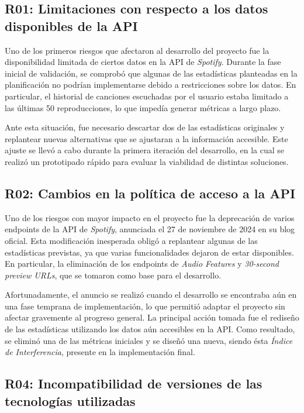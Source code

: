 \newpage

\subsection*{R01: Limitaciones con respecto a los datos disponibles de la API}

Uno de los primeros riesgos que afectaron al desarrollo del proyecto fue la disponibilidad limitada de ciertos datos en la API de \textit{Spotify}. Durante la fase inicial de validación, se comprobó que algunas de las estadísticas planteadas en la planificación no podrían implementarse debido a restricciones sobre los datos. En particular, el historial de canciones escuchadas por el usuario estaba limitado a las últimas 50 reproducciones, lo que impedía generar métricas a largo plazo.

Ante esta situación, fue necesario descartar dos de las estadísticas originales y replantear nuevas alternativas que se ajustaran a la información accesible. Este ajuste se llevó a cabo durante la primera iteración del desarrollo, en la cual se realizó un prototipado rápido para evaluar la viabilidad de distintas soluciones.

\subsection*{R02: Cambios en la política de acceso a la API}

Uno de los riesgos con mayor impacto en el proyecto fue la deprecación de varios endpoints de la API de \textit{Spotify}, anunciada el 27 de noviembre de 2024 en su blog oficial. Esta modificación inesperada obligó a replantear algunas de las estadísticas previstas, ya que varias funcionalidades dejaron de estar disponibles. En particular, la eliminación de los endpoints de \textit{Audio Features} y \textit{30-second preview URLs}, que se tomaron como base para el desarrollo.

Afortunadamente, el anuncio se realizó cuando el desarrollo se encontraba aún en una fase temprana de implementación, lo que permitió adaptar el proyecto sin afectar gravemente al progreso general. La principal acción tomada fue el rediseño de las estadísticas utilizando los datos aún accesibles en la API. Como resultado, se eliminó una de las métricas iniciales y se diseñó una nueva, siendo ésta \textit{Índice de Interferencia}, presente en la implementación final.

\subsection*{R04: Incompatibilidad de versiones de las tecnologías utilizadas}

